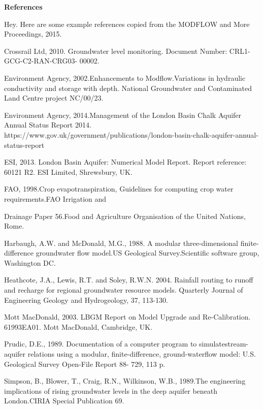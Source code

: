 \documentclass[12pt]{article}
\begin{document}
\begin{center}
   \textbf{References}
\end{center}
\begin{footnotesize}
   \setlength{\parindent}{0cm}
   \setlength{\parskip}{0.25cm}
   Hey. Here are some example references copied from the MODFLOW and More Proceedings, 2015.

Crossrail Ltd, 2010. Groundwater level monitoring. Document Number: CRL1-GCG-C2-RAN-CRG03-
00002.

Environment Agency, 2002.Enhancements to Modflow.Variations in hydraulic conductivity and storage
with depth. National Groundwater and Contaminated Land Centre project NC/00/23.

Environment Agency, 2014.Management of the London Basin Chalk Aquifer Annual Status Report
2014. https://www.gov.uk/government/publications/london-basin-chalk-aquifer-annual-status-report

ESI, 2013. London Basin Aquifer: Numerical Model Report. Report reference: 60121 R2. ESI Limited,
Shrewsbury, UK.

FAO, 1998.Crop evapotranspiration, Guidelines for computing crop water requirements.FAO Irrigation and

Drainage Paper 56.Food and Agriculture Organisation of the United Nations, Rome.

Harbaugh, A.W. and McDonald, M.G., 1988. A modular three-dimensional finite-difference groundwater
flow model.US Geological Survey.Scientific software group, Washington DC.

Heathcote, J.A., Lewis, R.T. and Soley, R.W.N. 2004. Rainfall routing to runoff and recharge for regional
groundwater resource models. Quarterly Journal of Engineering Geology and Hydrogeology, 37,
113-130.

Mott MacDonald, 2003. LBGM Report on Model Upgrade and Re-Calibration. 61993EA01. Mott
MacDonald, Cambridge, UK.

Prudic, D.E., 1989. Documentation of a computer program to simulatestream-aquifer relations using a
modular, finite-difference, ground-waterflow model: U.S. Geological Survey Open-File Report 88-
729, 113 p.

Simpson, B., Blower, T., Craig, R.N., Wilkinson, W.B., 1989.The engineering implications of rising
groundwater levels in the deep aquifer beneath London.CIRIA Special Publication 69. 
\end{footnotesize}
\end{document}
